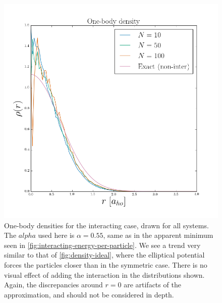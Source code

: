 \documentclass[a4paper, 11pt]{article}
\begin{document}
\begin{figure}[!h]
    \centering
    \includegraphics[width=0.8\linewidth]{../results/interacting-density.png}
    \caption{One-body densities for the interacting case, drawn for all systems.
    The $alpha$ used here is $\alpha=0.55$, same as in the apparent minimum seen
    in \autoref{fig:interacting-energy-per-particle}.
    We see a trend very similar to that of \autoref{fig:density-ideal}, where
    the elliptical potential forces the particles closer than in the symmetric
    case. There is no visual effect of adding the interaction in the
    distributions shown. Again, the discrepancies around $r=0$ are artifacts of
    the approximation, and should not be considered in depth.}
    \label{fig:one-body-interaction}
\end{figure}
\end{document}
